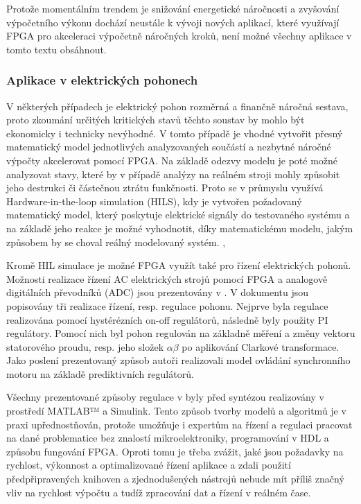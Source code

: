 \documentclass[a4paper, twoside, 11pt]{article}
\begin{document}
				Protože momentálním trendem je snižování energetické náročnosti a zvyšování výpočetního výkonu dochází neustále k vývoji nových aplikací, které využívají FPGA pro akceleraci výpočetně náročných kroků, není možné všechny aplikace v tomto textu obsáhnout.


			\subsubsection{Aplikace v elektrických pohonech}
			V některých případech je elektrický pohon rozměrná a finančně náročná sestava, proto zkoumání určitých kritických stavů těchto soustav by mohlo být ekonomicky i technicky nevýhodné. V tomto případě je vhodné vytvořit přesný matematický model jednotlivých analyzovaných součástí a nezbytné náročné výpočty akcelerovat pomocí FPGA. Na základě odezvy modelu je poté možné analyzovat stavy, které by v případě analýzy na reálném stroji mohly způsobit jeho destrukci či částečnou ztrátu funkčnosti. Proto se v průmyslu využívá Hardware-in-the-loop simulation (HILS), kdy je vytvořen požadovaný matematický model, který poskytuje elektrické signály do testovaného systému a na základě jeho reakce je možné vyhodnotit, díky matematickému modelu, jakým způsobem by se choval reálný modelovaný systém. \cite{andina-advanced-features-and-industrial-applications-of-fpga}, \cite{mathworks-discovery-hil-simulation}\par
			Kromě HIL simulace je možné FPGA využít také pro řízení elektrických pohonů. Možnosti realizace řízení AC elektrických strojů pomocí FPGA a analogově digitálních převodníků (ADC) jsou prezentovány v \cite{naouar-fpga-based-current-controllers-for-ac-machine-drives}. V dokumentu jsou popisovány tři realizace řízení, resp. regulace pohonu. Nejprve byla regulace realizována pomocí hystérézních on-off regulátorů, následně byly použity PI regulátory. Pomocí nich byl pohon regulován na základně měření a změny vektoru statorového proudu, resp. jeho složek $\alpha \beta$ po aplikování Clarkové transformace. Jako poslení prezentovaný způsob autoři realizovali model ovládání synchronního motoru na základě prediktivních regulátorů. \cite{naouar-fpga-based-current-controllers-for-ac-machine-drives}\par Všechny prezentované způsoby regulace v \cite{naouar-fpga-based-current-controllers-for-ac-machine-drives} byly před syntézou realizovány v prostředí MATLAB™️ a Simulink. Tento způsob tvorby modelů a algoritmů je v praxi upřednostňován, protože umožňuje i expertům na řízení a regulaci pracovat na dané problematice bez znalostí mikroelektroniky, programování v HDL a způsobu fungování FPGA. Oproti tomu je třeba zvážit, jaké jsou požadavky na rychlost, výkonnost a optimalizované řízení aplikace a zdali použití předpřipravených knihoven a zjednodušených nástrojů nebude mít příliš značný vliv na rychlost výpočtu a tudíž zpracování dat a řízení v reálném čase. \cite{naouar-fpga-based-current-controllers-for-ac-machine-drives}
			
\end{document}
